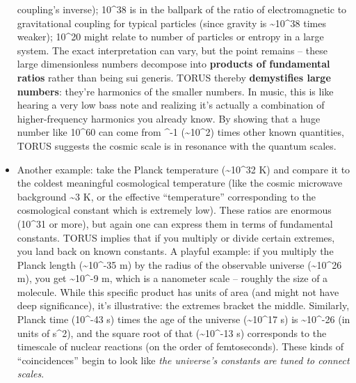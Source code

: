 \documentclass[
]{article}
\begin{document}
\begin{itemize}
  coupling's inverse)\hspace{0pt}; 10\^{}38 is in the ballpark of the
  ratio of electromagnetic to gravitational coupling for typical
  particles (since gravity is \textasciitilde10\^{}38 times
  weaker)\hspace{0pt}; 10\^{}20 might relate to number of particles or
  entropy in a large system. The exact interpretation can vary, but the
  point remains -- these large dimensionless numbers decompose into
  \textbf{products of fundamental ratios} rather than being sui generis.
  TORUS thereby \textbf{demystifies large numbers}: they're harmonics of
  the smaller numbers. In music, this is like hearing a very low bass
  note and realizing it's actually a combination of higher-frequency
  harmonics you already know. By showing that a huge number like
  10\^{}60 can come from \alpha\^{}-1 (\textasciitilde10\^{}2) times other
  known quantities, TORUS suggests the cosmic scale is in resonance with
  the quantum scales\hspace{0pt}.
\item
  Another example: take the Planck temperature (\textasciitilde10\^{}32
  K) and compare it to the coldest meaningful cosmological temperature
  (like the cosmic microwave background \textasciitilde3 K, or the
  effective ``temperature'' corresponding to the cosmological constant
  which is extremely low). These ratios are enormous (10\^{}31 or more),
  but again one can express them in terms of fundamental constants.
  TORUS implies that if you multiply or divide certain extremes, you
  land back on known constants. A playful example: if you multiply the
  Planck length (\textasciitilde10\^{}-35 m) by the radius of the
  observable universe (\textasciitilde10\^{}26 m), you get
  \textasciitilde10\^{}-9 m, which is a nanometer scale -- roughly the
  size of a molecule. While this specific product has units of area (and
  might not have deep significance), it's illustrative: the extremes
  bracket the middle. Similarly, Planck time (10\^{}-43 s) times the age
  of the universe (\textasciitilde10\^{}17 s) is
  \textasciitilde10\^{}-26 (in units of s\^{}2), and the square root of
  that (\textasciitilde10\^{}-13 s) corresponds to the timescale of
  nuclear reactions (on the order of femtoseconds). These kinds of
  ``coincidences'' begin to look like \emph{the universe's constants are
  tuned to connect scales}.
\end{itemize}
\end{document}
